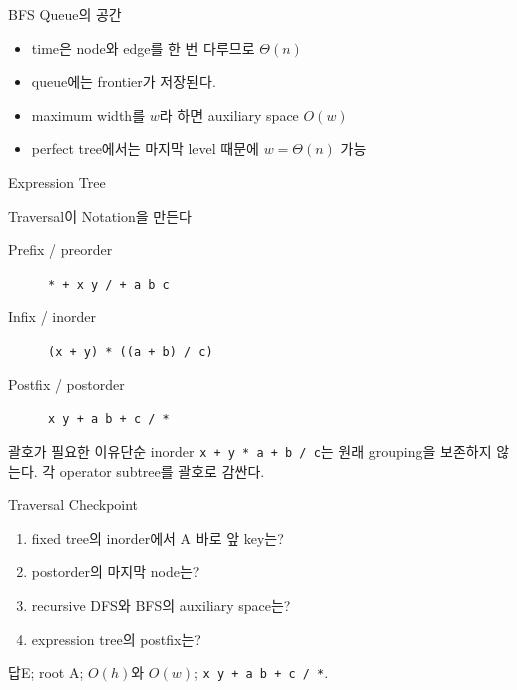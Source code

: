 \begin{frame}{BFS Queue의 공간}
\begin{itemize}
\item time은 node와 edge를 한 번 다루므로 $\Theta(n)$
\item queue에는 frontier가 저장된다.
\item maximum width를 $w$라 하면 auxiliary space $O(w)$
\item perfect tree에서는 마지막 level 때문에 $w=\Theta(n)$ 가능
\end{itemize}
\end{frame}
\begin{frame}{Expression Tree}
\centering{}
\end{frame}
\begin{frame}{Traversal이 Notation을 만든다}
\begin{description}
\item[Prefix / preorder] \texttt{* + x y / + a b c}
\item[Infix / inorder] \texttt{(x + y) * ((a + b) / c)}
\item[Postfix / postorder] \texttt{x y + a b + c / *}
\end{description}
\begin{alertblock}{괄호가 필요한 이유}단순 inorder \texttt{x + y * a + b / c}는 원래 grouping을 보존하지 않는다. 각 operator subtree를 괄호로 감싼다.\end{alertblock}
\end{frame}
\begin{frame}{Traversal Checkpoint}
\begin{enumerate}
\item fixed tree의 inorder에서 A 바로 앞 key는?
\item postorder의 마지막 node는?
\item recursive DFS와 BFS의 auxiliary space는?
\item expression tree의 postfix는?
\end{enumerate}
\begin{exampleblock}{답}E; root A; $O(h)$와 $O(w)$; \texttt{x y + a b + c / *}.\end{exampleblock}
\end{frame}
